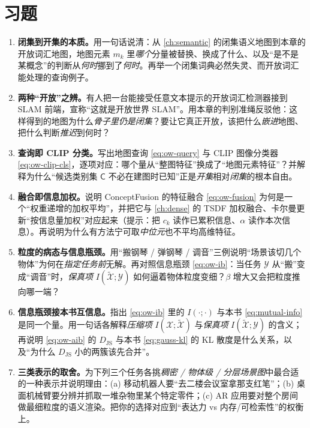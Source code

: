\section*{习题}
\begin{enumerate}
  \item \textbf{闭集到开集的本质。}\;用一句话说清：从 \cref{ch:semantic} 的闭集语义地图到本章的开放词汇地图，地图元素 $m_k$ 里\emph{哪个}分量被替换、换成了什么、以及“是不是某概念”的判断从\emph{何时}挪到了\emph{何时}。再举一个闭集词典必然失灵、而开放词汇能处理的查询例子。
  \item \textbf{两种“开放”之辨。}\;有人把一台能接受任意文本提示的开放词汇检测器接到 SLAM 前端，宣称“这就是开放世界 SLAM”。用本章的判别准绳反驳他：这样得到的地图为什么\emph{骨子里仍是闭集}？要让它真正开放，该把什么\emph{嵌进}地图、把什么判断\emph{推迟}到何时？
  \item \textbf{查询即 CLIP 分类。}\;写出地图查询 \cref{eq:ow-query} 与 CLIP 图像分类器 \cref{eq:ow-clip-cls}，逐项对应：哪个量从“整图特征”换成了“地图元素特征”？并解释为什么“候选类别集 $\mathsf{C}$ 不必在建图时已知”正是\emph{开集}相对\emph{闭集}的根本自由。
  \item \textbf{融合即信息加权。}\;说明 ConceptFusion 的特征融合 \cref{eq:ow-fusion} 为何是一个“权重递增的加权平均”，并把它与 \cref{ch:dense} 的 TSDF 加权融合、卡尔曼更新“按信息量加权”对应起来（提示：把 $c_k$ 读作已累积信息、$\alpha$ 读作本次信息）。再说明为什么有方法宁可取\emph{中位元}也不平均高维特征。
  \item \textbf{粒度的病态与信息瓶颈。}\;用“搬钢琴 / 弹钢琴 / 调音”三例说明“场景该切几个物体”为何在\emph{指定任务前}无解。再对照信息瓶颈 \cref{eq:ow-ib}：当任务 $\mathcal{Y}$ 从“搬”变成“调音”时，\emph{保真项} $I(\tilde{\mathcal{X}};\mathcal{Y})$ 如何逼着物体粒度变细？$\beta$ 增大又会把粒度推向哪一端？
  \item \textbf{信息瓶颈接本书互信息。}\;指出 \cref{eq:ow-ib} 里的 $I(\cdot;\cdot)$ 与本书 \cref{eq:mutual-info} 是同一个量。用一句话各解释\emph{压缩项} $I(\mathcal{X};\tilde{\mathcal{X}})$ 与\emph{保真项} $I(\tilde{\mathcal{X}};\mathcal{Y})$ 的含义；再说明 \cref{eq:ow-aib} 的 $D_{\mathrm{JS}}$ 与本书 \cref{eq:gauss-kl} 的 KL 散度是什么关系，以及“为什么 $D_{\mathrm{JS}}$ 小的两簇该先合并”。
  \item \textbf{三类表示的取舍。}\;为下列三个任务各挑\emph{稠密 / 物体级 / 分层场景图}中最合适的一种表示并说明理由：(a) 移动机器人要“去二楼会议室拿那支红笔”；(b) 桌面机械臂要分辨并抓取一堆杂物里某个特定零件；(c) AR 应用要对整个房间做最细粒度的语义渲染。把你的选择对应到“表达力 vs 内存/可检索性”的权衡上。

\end{enumerate}
